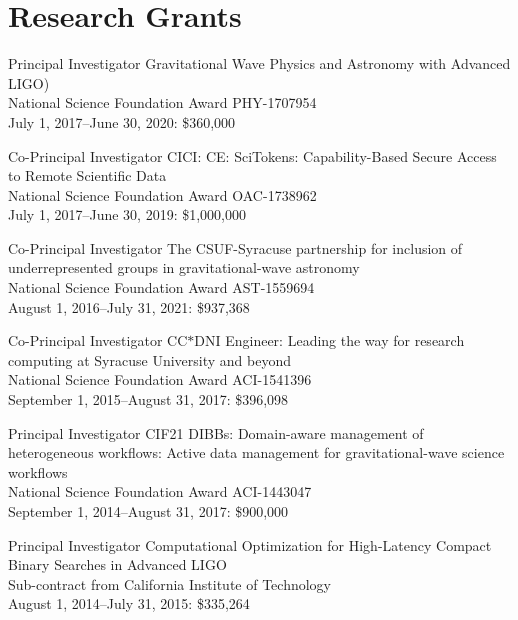 \documentclass{cv}
\begin{document}
\section{Research Grants}
\begin{wideentry}
\item[{Principal} Investigator]{Gravitational Wave Physics and Astronomy with Advanced LIGO)}\\
{\small National Science Foundation Award PHY-1707954\\
July 1, 2017--June 30, 2020: \$360,000}\\

\item[Co-{Principal} Investigator]{CICI: CE: SciTokens: Capability-Based Secure Access to Remote Scientific Data}\\
{\small National Science Foundation Award OAC-1738962\\
July 1, 2017--June 30, 2019: \$1,000,000}\\

\item[Co-{Principal} Investigator]{The CSUF-Syracuse partnership for inclusion of underrepresented groups in gravitational-wave astronomy}\\
{\small National Science Foundation Award AST-1559694\\
August 1, 2016--July 31, 2021: \$937,368}\\

\item[Co-{Principal} Investigator]{CC$\ast$DNI Engineer: Leading the way for research computing at Syracuse University and beyond}\\
{\small National Science Foundation Award ACI-1541396\\
September 1, 2015--August 31, 2017: \$396,098}\\

\item[Principal Investigator]{CIF21 DIBBs: Domain-aware management of heterogeneous workflows: Active data management for gravitational-wave science workflows}\\
{\small National Science Foundation Award ACI-1443047\\
September 1, 2014--August 31, 2017: \$900,000}\\

\item[Principal Investigator]{Computational Optimization for High-Latency Compact Binary Searches in Advanced LIGO}\\
{\small Sub-contract from California Institute of Technology\\
August 1, 2014--July 31, 2015: \$335,264}\\


\end{wideentry}
\end{document}
